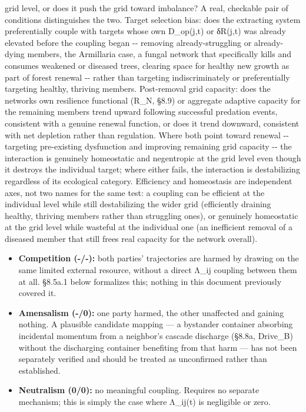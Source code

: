 \documentclass[
]{article}
\begin{document}
grid level, or does it push the grid toward imbalance? A real, checkable
pair of conditions distinguishes the two. Target selection bias: does
the extracting system preferentially couple with targets whose own
D\_op(j,t) or δR(j,t) was already elevated before the coupling began
-\/- removing already-struggling or already-dying members, the
Armillaria case, a fungal network that specifically kills and consumes
weakened or diseased trees, clearing space for healthy new growth as
part of forest renewal -\/- rather than targeting indiscriminately or
preferentially targeting healthy, thriving members. Post-removal grid
capacity: does the network\textquotesingle s own resilience functional
(R\_N, §8.9) or aggregate adaptive capacity for the remaining members
trend upward following successful predation events, consistent with a
genuine renewal function, or does it trend downward, consistent with net
depletion rather than regulation. Where both point toward renewal -\/-
targeting pre-existing dysfunction and improving remaining grid capacity
-\/- the interaction is genuinely homeostatic and negentropic at the
grid level even though it destroys the individual target; where either
fails, the interaction is destabilizing regardless of its ecological
category. Efficiency and homeostasis are independent axes, not two names
for the same test: a coupling can be efficient at the individual level
while still destabilizing the wider grid (efficiently draining healthy,
thriving members rather than struggling ones), or genuinely homeostatic
at the grid level while wasteful at the individual one (an inefficient
removal of a diseased member that still frees real capacity for the
network overall).

\begin{itemize}
\item
  \textbf{Competition (-/-):} both parties' trajectories are harmed by
  drawing on the same limited external resource, without a direct Λ\_ij
  coupling between them at all. §8.5a.1 below formalizes this; nothing
  in this document previously covered it.
\item
  \textbf{Amensalism (-/0):} one party harmed, the other unaffected and
  gaining nothing. A plausible candidate mapping --- a bystander
  container absorbing incidental momentum from a neighbor's cascade
  discharge (§8.8a, Drive\_B) without the discharging container
  benefiting from that harm --- has not been separately verified and
  should be treated as unconfirmed rather than established.
\item
  \textbf{Neutralism (0/0):} no meaningful coupling. Requires no
  separate mechanism; this is simply the case where Λ\_ij(t) is
  negligible or zero.
\end{itemize}
\end{document}
